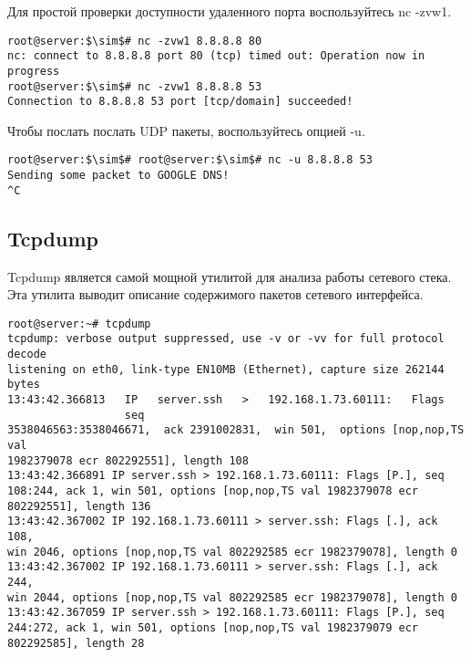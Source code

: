 \documentclass[14pt, a4paper]{article}
\begin{document}
Для простой проверки доступности удаленного порта воспользуйтесь \colorbox{backcolour}{nc -zvw1}.

\newpage

\begin{lstlisting}
root@server:$\sim$# nc -zvw1 8.8.8.8 80
nc: connect to 8.8.8.8 port 80 (tcp) timed out: Operation now in progress
root@server:$\sim$# nc -zvw1 8.8.8.8 53
Connection to 8.8.8.8 53 port [tcp/domain] succeeded!
\end{lstlisting}
\vspace{0.2cm}

Чтобы послать послать UDP пакеты, воспользуйтесь опцией -u.

\vspace{0.3cm}
\begin{lstlisting}
root@server:$\sim$# root@server:$\sim$# nc -u 8.8.8.8 53
Sending some packet to GOOGLE DNS!
^C
\end{lstlisting}

\subsection*{Tcpdump} 

Tcpdump является самой мощной утилитой для анализа работы сетевого стека. Эта утилита выводит
описание содержимого пакетов сетевого интерфейса.

\vspace{0.3cm}
\begin{lstlisting}
root@server:~# tcpdump
tcpdump: verbose output suppressed, use -v or -vv for full protocol decode
listening on eth0, link-type EN10MB (Ethernet), capture size 262144 bytes
13:43:42.366813   IP   server.ssh   >   192.168.1.73.60111:   Flags
                  seq
3538046563:3538046671,  ack 2391002831,  win 501,  options [nop,nop,TS val
1982379078 ecr 802292551], length 108
13:43:42.366891 IP server.ssh > 192.168.1.73.60111: Flags [P.], seq 
108:244, ack 1, win 501, options [nop,nop,TS val 1982379078 ecr 
802292551], length 136
13:43:42.367002 IP 192.168.1.73.60111 > server.ssh: Flags [.], ack 108, 
win 2046, options [nop,nop,TS val 802292585 ecr 1982379078], length 0
13:43:42.367002 IP 192.168.1.73.60111 > server.ssh: Flags [.], ack 244, 
win 2044, options [nop,nop,TS val 802292585 ecr 1982379078], length 0
13:43:42.367059 IP server.ssh > 192.168.1.73.60111: Flags [P.], seq 
244:272, ack 1, win 501, options [nop,nop,TS val 1982379079 ecr 
802292585], length 28
\end{lstlisting}
\vspace{0.2cm}
\end{document}
